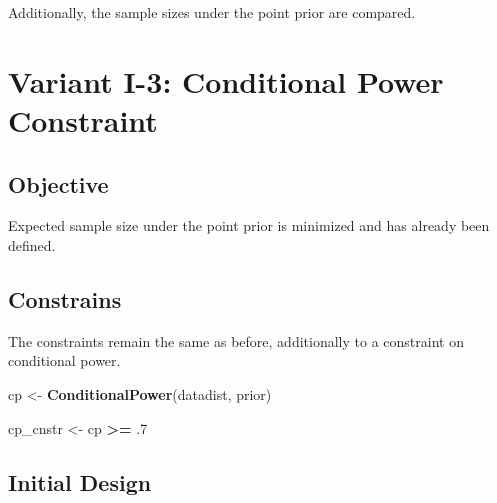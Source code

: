 \documentclass[]{book}
\newenvironment{Shaded}{\begin{snugshade}}{\end{snugshade}}
\newcommand{\DataTypeTok}[1]{\textcolor[rgb]{0.13,0.29,0.53}{#1}}
\newcommand{\FloatTok}[1]{\textcolor[rgb]{0.00,0.00,0.81}{#1}}
\newcommand{\KeywordTok}[1]{\textcolor[rgb]{0.13,0.29,0.53}{\textbf{#1}}}
\newcommand{\NormalTok}[1]{#1}
\newcommand{\OperatorTok}[1]{\textcolor[rgb]{0.81,0.36,0.00}{\textbf{#1}}}
\newcommand{\StringTok}[1]{\textcolor[rgb]{0.31,0.60,0.02}{#1}}
\begin{document}
Additionally, the sample sizes under the point prior are compared.

\begin{Shaded}
\end{Shaded}

\hypertarget{variantI_3}{%
\section{Variant I-3: Conditional Power Constraint}\label{variantI_3}}

\hypertarget{objective-2}{%
\subsection{Objective}\label{objective-2}}

Expected sample size under the point prior is minimized and has already been
defined.

\hypertarget{constrains-2}{%
\subsection{Constrains}\label{constrains-2}}

The constraints remain the same as before, additionally to a constraint
on conditional power.

\begin{Shaded}
\begin{Highlighting}[]
\NormalTok{cp <-}\StringTok{ }\KeywordTok{ConditionalPower}\NormalTok{(datadist, prior)}

\NormalTok{cp_cnstr <-}\StringTok{ }\NormalTok{cp }\OperatorTok{>=}\StringTok{ }\FloatTok{.7}
\end{Highlighting}
\end{Shaded}

\hypertarget{initial-design-2}{%
\subsection{Initial Design}\label{initial-design-2}}
\end{document}
